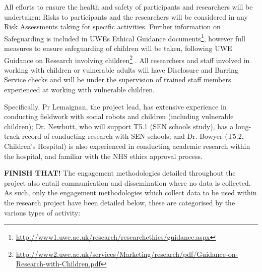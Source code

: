 \documentclass[11pt,a4paper]{report}
\newcommand{\TODO}[1]{{\color{red}\textbf{#1}}}
\begin{document}
All efforts to ensure the health and safety of participants and researchers will
be undertaken: Risks to participants and the researchers will be considered in
any Risk Assessments taking for specific activities. Further information on
Safeguarding is included in UWEs Ethical Guidance
documents\footnote{\url{http://www1.uwe.ac.uk/research/researchethics/guidance.aspx}},
however full measures to ensure safeguarding of children will be taken,
following UWE Guidance on Research involving
children\footnote{\url{http://www2.uwe.ac.uk/services/Marketing/research/pdf/Guidance-on-Research-with-Children.pdf}}
. All researchers and staff involved in working with children or vulnerable
adults will have Disclosure and Barring Service checks and will be under the
supervision of trained staff members experienced at working with
vulnerable children.

Specifically, Pr Lemaignan, the project lead, has extensive experience in
conducting fieldwork with social robots and children (including vulnerable
children); Dr. Newbutt, who will support T5.1 (SEN schools study), has a
long-track record of conducting research with SEN schools; and Dr. Bowyer (T5.2,
Children's Hospital) is also experienced in conducting academic research within
the hospital, and familiar with the NHS ethics approval process.


\TODO{FINISH THAT!}
The engagement methodologies detailed throughout the project also entail communication and
dissemination where no data is collected. As such, only the engagement methodologies which
collect data to be used within the research project have been detailed below, these are categorised
by the various types of activity:
\end{document}
